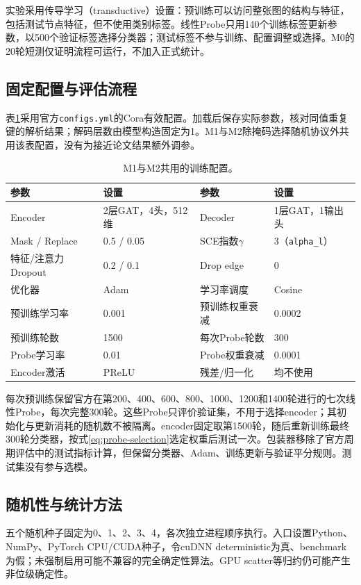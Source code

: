 实验采用传导学习（transductive）设置：预训练可以访问整张图的结构与特征，包括测试节点特征，但不使用类别标签。线性Probe只用140个训练标签更新参数，以500个验证标签选择分类器；测试标签不参与训练、配置调整或选择。M0的20轮短测仅证明流程可运行，不加入正式统计。

\subsection{固定配置与评估流程}
表\ref{tab:hyperparameters}采用官方\texttt{configs.yml}的Cora有效配置。加载后保存实际参数，核对同值重复键的解析结果；解码层数由模型构造固定为1。M1与M2除掩码选择随机协议外共用该表配置，没有为接近论文结果额外调参。
\begin{table}[tbp]
\centering\small
\caption{M1与M2共用的训练配置。}\label{tab:hyperparameters}
\begin{tabularx}{\linewidth}{lXlX}\toprule
参数 & 设置 & 参数 & 设置\\\midrule
Encoder & 2层GAT，4头，512维 & Decoder & 1层GAT，1输出头\\
Mask / Replace & 0.5 / 0.05 & SCE指数$\gamma$ & 3（\texttt{alpha\_l}）\\
特征/注意力Dropout & 0.2 / 0.1 & Drop edge & 0\\
优化器 & Adam & 学习率调度 & Cosine\\
预训练学习率 & 0.001 & 预训练权重衰减 & 0.0002\\
预训练轮数 & 1500 & 每次Probe轮数 & 300\\
Probe学习率 & 0.01 & Probe权重衰减 & 0.0001\\
Encoder激活 & PReLU & 残差/归一化 & 均不使用\\\bottomrule
\end{tabularx}
\end{table}

每次预训练保留官方在第200、400、600、800、1000、1200和1400轮进行的七次线性Probe，每次完整300轮。这些Probe只评价验证集，不用于选择encoder；其初始化与更新消耗的随机数不被隔离。encoder固定取第1500轮，随后重新训练最终300轮分类器，按式\eqref{eq:probe-selection}选定权重后测试一次。包装器移除了官方周期评估中的测试指标计算，但保留分类器、Adam、训练更新与验证平分规则。测试集没有参与选模。

\subsection{随机性与统计方法}
五个随机种子固定为0、1、2、3、4，各次独立进程顺序执行。入口设置Python、NumPy、PyTorch CPU/CUDA种子，令cuDNN deterministic为真、benchmark为假；未强制启用可能不兼容的完全确定性算法。GPU scatter等归约仍可能产生非位级确定性。


